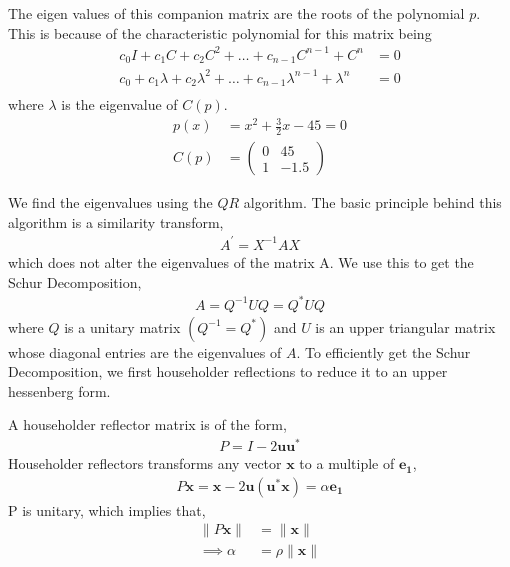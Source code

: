 \documentclass{beamer}
\providecommand{\brak}[1]{\ensuremath{\left(#1\right)}}
\theoremstyle{remark}
\providecommand{\norm}[1]{\lVert#1\rVert}
\newcommand{\myvec}[1]{\ensuremath{\begin{pmatrix}#1\end{pmatrix}}}
\let\vec\mathbf
\numberwithin{equation}{section}
\begin{document}
\begin{frame}
The eigen values of this companion matrix are the roots of the polynomial $p$. This is because of the characteristic polynomial for this matrix being
\begin{align}
  c_0I + c_1C + c_2C^2 + \dots + c_{n - 1}C^{n - 1} + C^n &= 0\\
  c_0 + c_1\lambda + c_2\lambda^2 + \dots + c_{n - 1}\lambda^{n - 1} + \lambda^n &= 0\\
\end{align}
where $\lambda$ is the eigenvalue of $C\brak{p}$.
\begin{align}
    p\brak{x} &= x^2 + \frac{3}{2}x - 45 = 0\\
    C\brak{p} &= \myvec{0 & 45\\1 & -1.5}
\end{align}
\end{frame}

\begin{frame}
We find the eigenvalues using the $QR$ algorithm. The basic principle behind this algorithm is a similarity transform,
\begin{align}
  A^{\prime} = X^{-1}AX
\end{align}
which does not alter the eigenvalues of the matrix A. 
\newline
We use this to get the Schur Decomposition,
\begin{align}
  A = Q^{-1}UQ = Q^{\ast}UQ
\end{align}
where $Q$ is a unitary matrix $\brak{Q^{-1} = Q^{\ast}}$ and $U$ is an upper triangular matrix whose diagonal entries are the eigenvalues of $A$.
\newline
To efficiently get the Schur Decomposition, we first householder reflections to reduce it to an upper hessenberg form.
\end{frame}

\begin{frame}
A householder reflector matrix is of the form,
\begin{align}
  P = I - 2\vec{u}\vec{u^{\ast}}
\end{align}
Householder reflectors transforms any vector $\vec{x}$ to a multiple of $\vec{e_1}$,
\begin{align}
  P\vec{x} = \vec{x} - 2\vec{u}\brak{\vec{u^{\ast}}\vec{x}} = \alpha \vec{e_1}
\end{align}
P is unitary, which implies that,
\begin{align}
  \norm{P\vec{x}} &= \norm{\vec{x}}\\
  \implies \alpha &= \rho\norm{\vec{x}}\\
\end{align}
\end{frame}
\end{document}
